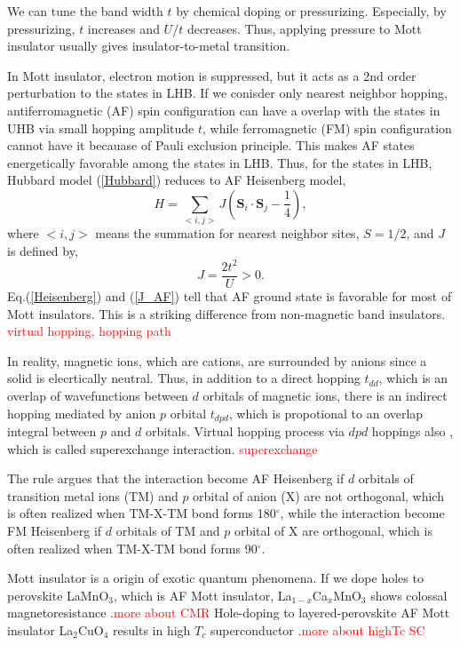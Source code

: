 We can tune the band width $t$ by chemical doping or pressurizing.
Especially, by pressurizing, $t$ increases and $U/t$ decreases.
Thus, applying pressure to Mott insulator usually gives insulator-to-metal transition.

In Mott insulator, electron motion is suppressed, but it acts as a 2nd order perturbation to the states in LHB.
If we conisder only nearest neighbor hopping, antiferromagnetic (AF) spin configuration can have a overlap with the states in UHB via small hopping amplitude $t$, while ferromagnetic (FM) spin configuration cannot have it becauase of Pauli exclusion principle.
This makes AF states energetically favorable among the states in LHB.
Thus, for the states in LHB, Hubbard model (\ref{Hubbard}) reduces to AF Heisenberg model,
\begin{equation}
H = \sum_{<i,j>}J\left(\bm{S}_i\cdot\bm{S}_j - \frac{1}{4}\right),
\label{Heisenberg}
\end{equation}
where $<i,j>$ means the summation for nearest neighbor sites, $S = 1/2$, and $J$ is defined by,
\begin{equation}
J = \frac{2t^2}{U} > 0.
\label{J_AF}
\end{equation}
Eq.(\ref{Heisenberg}) and (\ref{J_AF}) tell that AF ground state is favorable for most of Mott insulators.
This is a striking difference from non-magnetic band insulators.
\textcolor{red}{virtual hopping, hopping path}

In reality, magnetic ions, which are cations, are surrounded by anions since a solid is elecrtically neutral.
Thus, in addition to a direct hopping $t_{dd}$, which is an overlap of wavefunctions between $d$ orbitals of magnetic ions, there is an indirect hopping mediated by anion $p$ orbital $t_{dpd}$, which is propotional to an overlap integral between $p$ and $d$ orbitals.
Virtual hopping process via $dpd$ hoppings also , which is called superexchange interaction.
\textcolor{red}{superexchange}

The rule argues that the interaction become AF Heisenberg if $d$ orbitals of transition metal ions (TM) and $p$ orbital of anion (X) are not orthogonal, which is often realized when TM-X-TM bond forms 180$^\circ$, while the interaction become FM Heisenberg if $d$ orbitals of TM and $p$ orbital of X are orthogonal, which is often realized when TM-X-TM bond forms 90$^\circ$.


Mott insulator is a origin of exotic quantum phenomena.
If we dope holes to perovskite LaMnO$_3$, which is AF Mott insulator, La$_{1-x}$Ca$_x$MnO$_3$ shows colossal magnetoresistance \cite{ramirez1997colossal}.\textcolor{red}{more about CMR}
Hole-doping to layered-perovskite AF Mott insulator La$_2$CuO$_4$ results in high $T_c$ superconductor \cite{dagotto2005complexity}.\textcolor{red}{more about highTc SC}

